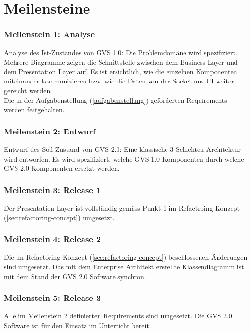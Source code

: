 \documentclass[11pt,a4paper,english,oneside]{book}
\numberwithin{equation}{chapter}
\begin{document}
	
	
	\section{Meilensteine}
	\label{sec:milestones}
	
	\subsubsection{Meilenstein 1: Analyse}
	Analyse des Ist-Zustandes von GVS 1.0: Die Problemdomäne wird spezifiziert. Mehrere Diagramme zeigen die Schnittstelle zwischen dem Business Layer und dem Presentation Layer auf. Es ist ersichtlich, wie die einzelnen Komponenten miteinander kommunizieren bzw. wie die Daten von der Socket ans UI weiter gereicht werden.\\
	
	\noindent
	Die in der Aufgabenstellung (\ref{aufgabenstellung}) geforderten Requirements werden festgehalten.
	
	\subsubsection{Meilenstein 2: Entwurf}
	\label{milestone2}
	Entwurf des Soll-Zustand von GVS 2.0: Eine klassische 3-Schichten Architektur wird entworfen. Es wird spezifiziert, welche GVS 1.0 Komponenten durch welche GVS 2.0 Komponenten ersetzt werden. 
	
	\subsubsection{Meilenstein 3: Release 1}
	Der Presentation Layer ist vollständig gemäss Punkt 1 im Refactroing Konzept (\ref{sec:refactoring-concept}) umgesetzt.
	
	\subsubsection{Meilenstein 4: Release 2}
	Die im Refactoring Konzept (\ref{sec:refactoring-concept}) beschlossenen Änderungen sind umgesetzt. Das mit dem Enterprise Architekt erstellte Klassendiagramm ist mit dem Stand der GVS 2.0 Software synchron.
	
	\subsubsection{Meilenstein 5: Release 3}
	Alle im Meilenstein 2 definierten Requirements sind umgesetzt. Die GVS 2.0 Software ist für den Einsatz im Unterricht bereit.
	
\end{document}
